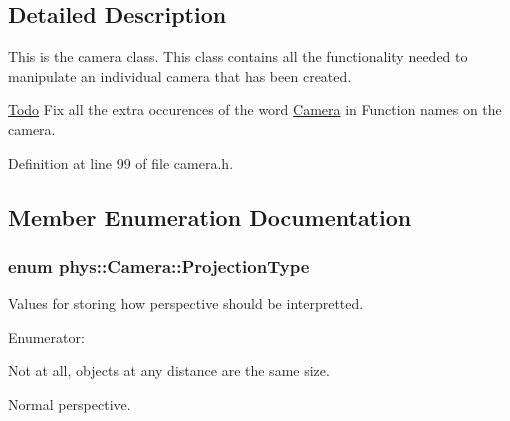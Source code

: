 \subsection{Detailed Description}
This is the camera class. This class contains all the functionality needed to manipulate an individual camera that has been created. \begin{Desc}
\item[\hyperlink{todo__todo000005}{Todo}]Fix all the extra occurences of the word \hyperlink{classphys_1_1Camera}{Camera} in Function names on the camera. \end{Desc}


Definition at line 99 of file camera.h.



\subsection{Member Enumeration Documentation}
\hypertarget{classphys_1_1Camera_a87d8d46e9eb2080b10712079be69d86a}{
\subsubsection[{ProjectionType}]{\setlength{\rightskip}{0pt plus 5cm}enum {\bf phys::Camera::ProjectionType}}}
\label{d9/df8/classphys_1_1Camera_a87d8d46e9eb2080b10712079be69d86a}


Values for storing how perspective should be interpretted. 

\begin{Desc}
\item[Enumerator: ]\par
\begin{description}
\item[{\em 
\hypertarget{classphys_1_1Camera_a87d8d46e9eb2080b10712079be69d86aa6a71e6ab2139c8fc4d48d64aa9717f02}{
Orthographic}
\label{d9/df8/classphys_1_1Camera_a87d8d46e9eb2080b10712079be69d86aa6a71e6ab2139c8fc4d48d64aa9717f02}
}]Not at all, objects at any distance are the same size. \item[{\em 
\hypertarget{classphys_1_1Camera_a87d8d46e9eb2080b10712079be69d86aacfe21986c8c655b8d19ebd76118de055}{
Perspective}
\label{d9/df8/classphys_1_1Camera_a87d8d46e9eb2080b10712079be69d86aacfe21986c8c655b8d19ebd76118de055}
}]Normal perspective. \end{description}
\end{Desc}



